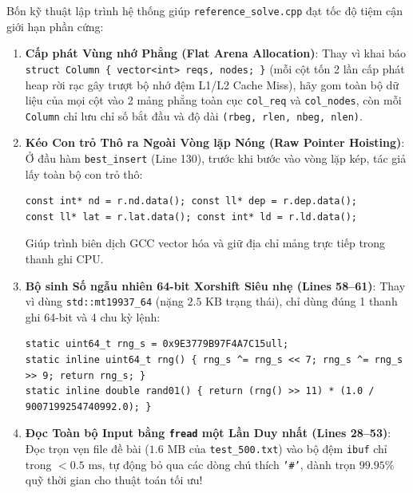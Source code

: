 \documentclass[11pt,a4paper]{article}
\begin{document}
Bốn kỹ thuật lập trình hệ thống giúp \texttt{reference\_solve.cpp} đạt tốc độ tiệm cận giới hạn phần cứng:
\begin{enumerate}[leftmargin=1.5em]
    \item \textbf{Cấp phát Vùng nhớ Phẳng (Flat Arena Allocation)}:
    Thay vì khai báo \texttt{struct Column \{ vector<int> reqs, nodes; \}} (mỗi cột tốn 2 lần cấp phát heap rời rạc gây trượt bộ nhớ đệm L1/L2 Cache Miss), hãy gom toàn bộ dữ liệu của mọi cột vào 2 mảng phẳng toàn cục \texttt{col\_req} và \texttt{col\_nodes}, còn mỗi \texttt{Column} chỉ lưu chỉ số bắt đầu và độ dài \texttt{(rbeg, rlen, nbeg, nlen)}.
    \item \textbf{Kéo Con trỏ Thô ra Ngoài Vòng lặp Nóng (Raw Pointer Hoisting)}:
    Ở đầu hàm \texttt{best\_insert} (Line 130), trước khi bước vào vòng lặp kép, tác giả lấy toàn bộ con trỏ thô:
    \begin{lstlisting}
const int* nd = r.nd.data(); const ll* dep = r.dep.data();
const ll* lat = r.lat.data(); const int* ld = r.ld.data();
    \end{lstlisting}
    Giúp trình biên dịch GCC vector hóa và giữ địa chỉ mảng trực tiếp trong thanh ghi CPU.
    \item \textbf{Bộ sinh Số ngẫu nhiên 64-bit Xorshift Siêu nhẹ (Lines 58--61)}:
    Thay vì dùng \texttt{std::mt19937\_64} (nặng $2.5\text{ KB}$ trạng thái), chỉ dùng đúng 1 thanh ghi 64-bit và 4 chu kỳ lệnh:
    \begin{lstlisting}
static uint64_t rng_s = 0x9E3779B97F4A7C15ull;
static inline uint64_t rng() { rng_s ^= rng_s << 7; rng_s ^= rng_s >> 9; return rng_s; }
static inline double rand01() { return (rng() >> 11) * (1.0 / 9007199254740992.0); }
    \end{lstlisting}
    \item \textbf{Đọc Toàn bộ Input bằng \texttt{fread} một Lần Duy nhất (Lines 28--53)}:
    Đọc trọn vẹn file đề bài ($1.6\text{ MB}$ của \texttt{test\_500.txt}) vào bộ đệm \texttt{ibuf} chỉ trong $<0.5\text{ ms}$, tự động bỏ qua các dòng chú thích \texttt{'\#'}, dành trọn $99.95\%$ quỹ thời gian cho thuật toán tối ưu!
\end{enumerate}
\end{document}
